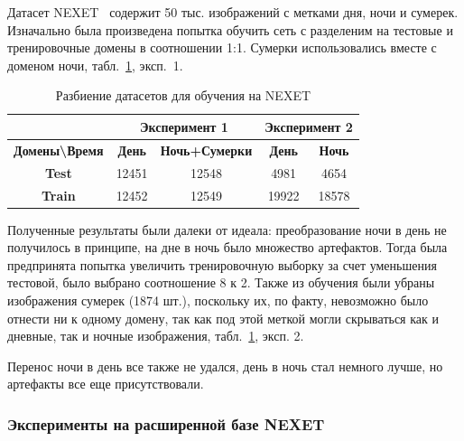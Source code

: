 \documentclass[11pt,a4paper]{extarticle}
\begin{document}
{			Датасет NEXET~\cite{data:nexet} содержит 50 тыс. изображений с метками дня, ночи и сумерек.
			Изначально была произведена попытка обучить сеть с разделеним на тестовые и тренировочные домены в соотношении 1:1.
			Сумерки использовались вместе с доменом ночи, табл.~\ref{tab:tests:nexet}, эксп.~1.
			\begin{table}[ht]
				\centering
				\begin{tabular}{|c|c|c|c|c|}
				\hline
				\rowcolor[HTML]{EFEFEF} 
				\multicolumn{1}{|l|}{\cellcolor[HTML]{EFEFEF}} & \multicolumn{2}{c|}{\cellcolor[HTML]{EFEFEF}\textbf{Эксперимент 1}} & \multicolumn{2}{c|}{\cellcolor[HTML]{EFEFEF}\textbf{Эксперимент 2}} \\ \hline
				\rowcolor[HTML]{EFEFEF} 
				\textbf{Домены\textbackslash{}Время}           & \textbf{День}                & \textbf{Ночь+Сумерки}                & \textbf{День}                    & \textbf{Ночь}                    \\ \hline
				\cellcolor[HTML]{EFEFEF}\textbf{Test}          & 12451                        & 12548                                & 4981                             & 4654                             \\ \hline
				\cellcolor[HTML]{EFEFEF}\textbf{Train}         & 12452                        & 12549                                & 19922                            & 18578                            \\ \hline
				\end{tabular}
				\caption{Разбиение датасетов для обучения на NEXET}
				\label{tab:tests:nexet}
			\end{table}

			\noindent
			Полученные результаты были далеки от идеала: преобразование ночи в день не получилось в принципе, на дне в ночь было множество артефактов.
			Тогда была предпринята попытка увеличить тренировочную выборку за счет уменьшения тестовой, было выбрано соотношение 8 к 2. 
			Также из обучения были убраны изображения сумерек (1874 шт.), поскольку их, по факту, невозможно было отнести ни к одному домену, так как под этой меткой могли скрываться как и дневные, так и ночные изображения, табл.~\ref{tab:tests:nexet}, эксп. 2.  
			
			Перенос ночи в день все также не удался, день в ночь стал немного лучше, но артефакты все еще присутствовали.

		\subsubsection{Эксперименты на расширенной базе NEXET}\label{sec:tests:nexet_ext}
			
}
\end{document}
